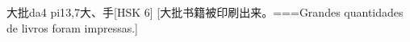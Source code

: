 \begin{EntryWithPhonetic}{大批}{da4 pi1}{3,7}{⼤、⼿}[HSK 6]
  [大批书籍被印刷出来。===Grandes quantidades de livros foram impressas.]
\end{EntryWithPhonetic}


